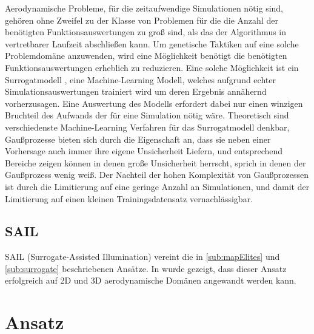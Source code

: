 \documentclass[12pt]{article}
\begin{document}
Aerodynamische Probleme, für die zeitaufwendige Simulationen nötig sind, gehören ohne Zweifel zu der Klasse von Problemen für die die Anzahl der benötigten Funktionsauswertungen zu groß sind, als das der Algorithmus in vertretbarer Laufzeit abschließen kann.
Um genetische Taktiken auf eine solche Problemdomäne anzuwenden, wird eine Möglichkeit benötigt die benötigten Funktionsauswertungen erheblich zu reduzieren.
Eine solche Möglichkeit ist ein Surrogatmodell \cite{Jin.2011}\cite{Preen.2016}, eine Machine-Learning Modell, welches aufgrund echter Simulationsauswertungen trainiert wird um deren Ergebnis annähernd vorherzusagen.
Eine Auswertung des Modells erfordert dabei nur einen winzigen Bruchteil des Aufwands der für eine Simulation nötig wäre.
Theoretisch sind verschiedenste Machine-Learning Verfahren für das Surrogatmodell denkbar, Gaußprozesse bieten sich durch die Eigenschaft an, dass sie neben einer Vorhersage auch immer ihre eigene Unsicherheit Liefern, und entsprechend Bereiche zeigen können in denen große Unsicherheit herrscht, sprich in denen der Gaußprozess wenig weiß.
Der Nachteil der hohen Komplexität von Gaußprozessen  ist durch die Limitierung auf eine geringe Anzahl an Simulationen, und damit der Limitierung auf einen kleinen Trainingsdatensatz vernachlässigbar.

\subsection{SAIL}

SAIL (Surrogate-Assisted Illumination) vereint die in \ref{sub:mapElites} und \ref{sub:surrogate} beschriebenen Ansätze.
In \cite{Gaier.6152018} wurde gezeigt, dass dieser Ansatz erfolgreich auf 2D und 3D aerodynamische Domänen angewandt werden kann.

\section{Ansatz}
\end{document}
